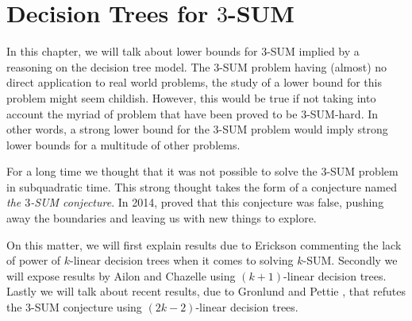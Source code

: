 \chapter{Decision Trees for $3$-SUM}

In this chapter, we will talk about lower bounds for $3$-SUM implied by
a reasoning on the decision tree model. The $3$-SUM problem having (almost) no
direct application to real world problems, the study of a lower bound for this
problem might seem childish. However, this would be true if not taking into
account the myriad of problem that have been proved to be $3$-SUM-hard. In
other words, a strong lower bound for the $3$-SUM problem would imply strong
lower bounds for a multitude of other problems.

For a long time we thought that it was not possible to solve the $3$-SUM
problem in subquadratic time. This strong thought takes the form of a
conjecture named \emph{the $3$-SUM conjecture}. In 2014, \citet*{gronlund:2014}
proved that this conjecture was false, pushing away the
boundaries and leaving us with new things to explore.

On this matter, we will first explain results due to
Erickson \cite{erickson:1999} commenting the lack of power of $k$-linear
decision trees when it comes to solving $k$-SUM. Secondly we will expose
results by Ailon and
Chazelle \cite{ailon:2005} using $(k+1)$-linear decision trees.
Lastly we will talk about recent results, due to Gronlund and
Pettie \cite{gronlund:2014}, that refutes the $3$-SUM conjecture using
$(2k-2)$-linear decision trees.
